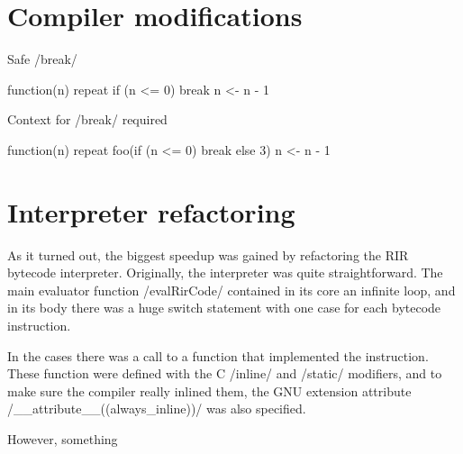 
\section{Compiler modifications}


\begin{listing}[htbp]
  \caption{\label{lst:local-break}Safe \rinline/break/}
  \begin{rcode}
function(n) {
    repeat {
        if (n <= 0) break
        n <- n - 1
    }
}
  \end{rcode}
\end{listing}

\begin{listing}[htbp]
  \caption{\label{lst:non-local-break}Context for \rinline/break/ required}
  \begin{rcode}
function(n) {
    repeat {
        foo(if (n <= 0) break else 3)
        n <- n - 1
    }
}
  \end{rcode}
\end{listing}


\section{Interpreter refactoring}

As it turned out, the biggest speedup was gained by refactoring the RIR bytecode interpreter. Originally, the interpreter was quite straightforward. The main evaluator function \cinline/evalRirCode/ contained in its core an infinite loop, and in its body there was a huge switch statement with one case for each bytecode instruction.

In the cases there was a call to a function that implemented the instruction. These function were defined with the C \cinline/inline/ and \cinline/static/ modifiers, and to make sure the compiler really inlined them, the GNU extension attribute \cinline/__attribute__((always_inline))/ was also specified.

However, something 

\begin{listing}[htbp]
  \caption{\label{lst:}}
  \begin{rcode}

  \end{rcode}
\end{listing}

